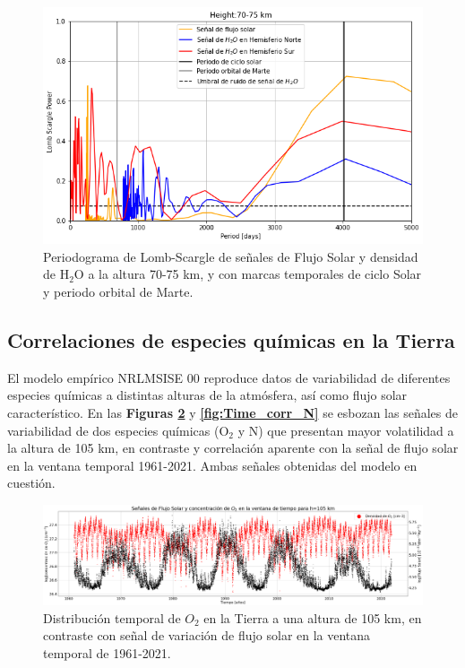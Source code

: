 \documentclass[a4paper,alpha-refs]{eSpectra}
\begin{document}
\begin{figure}[htp]
	\includegraphics[width=\columnwidth, scale=2]{Imagenes/periodogramaLSP_M.png}
    \caption{Periodograma de Lomb-Scargle de se\~nales de Flujo Solar y densidad de H$_2$O a la altura 70-75 km, y con marcas temporales de ciclo Solar y periodo orbital de Marte.}
    \label{fig:periodogramaLSP_M70}
\end{figure}


\subsection{Correlaciones de especies qu\'imicas en la Tierra}

El modelo emp\'irico NRLMSISE 00 reproduce datos de variabilidad de diferentes especies qu\'imicas a distintas alturas de la atm\'osfera, as\'i como flujo solar caracter\'istico. En las \textbf{Figuras \ref{fig:Time_corr_O2}} y \textbf{\ref{fig:Time_corr_N}} se esbozan las se\~nales de variabilidad de dos especies qu\'imicas (O$_2$ y N) que presentan mayor volatilidad a la altura de 105 km, en contraste y correlaci\'on aparente con la se\~nal de flujo solar en la ventana temporal 1961-2021. Ambas se\~nales obtenidas del modelo en cuesti\'on. 



\begin{figure}
\vspace*{-5mm} %
\centering
	\includegraphics[width=\textwidth, scale=2]{Imagenes/Time_corr_O2.png}
    \caption{Distribuci\'on temporal de $O_2$ en la Tierra a una altura de 105 km, en contraste con se\~nal de variaci\'on de flujo solar en la ventana temporal de 1961-2021.}
    \label{fig:Time_corr_O2}
\end{figure}
\end{document}
